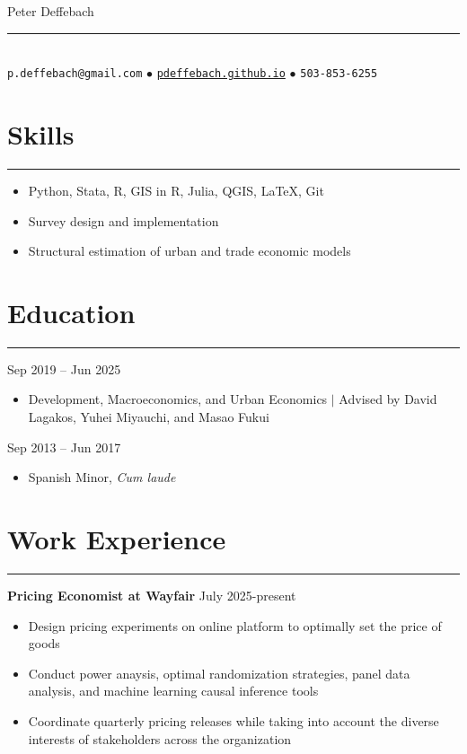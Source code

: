 \documentclass[10pt]{article}
\newenvironment{customitemize}
{ \begin{itemize}[leftmargin=\parindent, topsep = 0.2pt, itemsep = -3pt] }
{\end{itemize} }
\begin{document}
\normalsize
\singlespacing
\thispagestyle{empty}

\begin{center}
{\Large  Peter Deffebach} \\ 
\vspace{-5pt}
\rule{3in}{1pt} \\
\texttt{p.deffebach@gmail.com} $\bullet$ \href{https://pdeffebach.github.io/}{\texttt{pdeffebach.github.io}} $\bullet$ \texttt{503-853-6255}  \\
\end{center} 

\vspace{-12pt}
\section*{Skills}
\noindent \rule{\textwidth}{1pt} 
\begin{customitemize}
	\item Python, Stata, R, GIS in R, Julia, QGIS, LaTeX, Git
	\item Survey design and implementation
	\item Structural estimation of urban and trade economic models
\end{customitemize}

\section*{Education}
\noindent \rule{\textwidth}{1pt} 
  \hfill Sep 2019 -- Jun 2025
\begin{customitemize}
	\item Development, Macroeconomics, and Urban Economics $\big |$ Advised by David Lagakos, Yuhei Miyauchi, and Masao Fukui
\end{customitemize}
  \hfill Sep 2013 -- Jun 2017
\begin{customitemize}
	\item Spanish Minor, \textit{Cum laude}
\end{customitemize}

\section*{Work Experience} 
\noindent \rule{\textwidth}{1pt} 
\noindent \textbf{Pricing Economist at Wayfair}  \hfill July 2025-present
\begin{customitemize}
	\item Design pricing experiments on online platform to optimally set the price of goods
	\item Conduct power anaysis, optimal randomization strategies, panel data analysis, and machine learning causal inference tools
	\item Coordinate quarterly pricing releases while taking into account the diverse interests of stakeholders across the organization
\end{customitemize}
\end{document}
